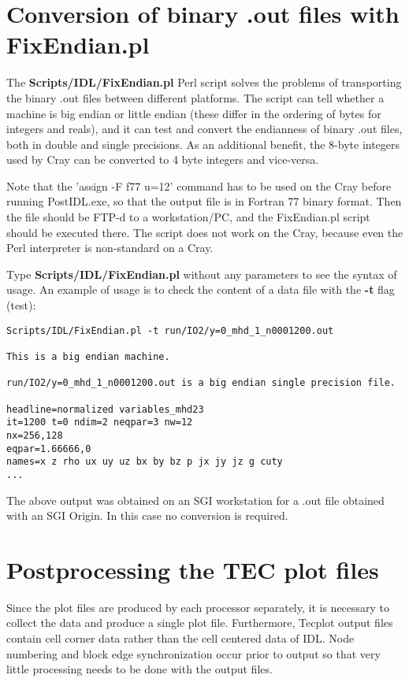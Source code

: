 \section{Conversion of binary .out files with FixEndian.pl \label{section:convert_bin}}

The {\bf Scripts/IDL/FixEndian.pl} Perl script solves the problems of 
transporting the binary .out files between different platforms.
The script can tell whether a machine is big endian or little
endian (these differ in the ordering of bytes for integers and reals),
and it can test and convert the endianness of binary .out files,
both in double and single precisions. As an additional benefit,
the 8-byte integers used by Cray can be converted to 4 byte integers
and vice-versa.

Note that the 'assign -F f77 u=12' command has to be used on the Cray 
before running PostIDL.exe, so that the output file is in Fortran 77 
binary format. Then the file should be FTP-d to a workstation/PC, and the 
FixEndian.pl script should be executed there. The script does not work on
the Cray, because even the Perl interpreter is non-standard on a Cray.

Type {\bf Scripts/IDL/FixEndian.pl} without any parameters to see the syntax of usage.
An example of usage is to check the content of a data file with the
{\bf -t} flag (test):
\begin{verbatim}
Scripts/IDL/FixEndian.pl -t run/IO2/y=0_mhd_1_n0001200.out

This is a big endian machine.

run/IO2/y=0_mhd_1_n0001200.out is a big endian single precision file.

headline=normalized variables_mhd23                                            
it=1200 t=0 ndim=2 neqpar=3 nw=12
nx=256,128
eqpar=1.66666,0
names=x z rho ux uy uz bx by bz p jx jy jz g cuty
...
\end{verbatim}
The above output was obtained on an SGI workstation for a .out file 
obtained with an SGI Origin. In this case no conversion is required.

\section{Postprocessing the TEC plot files \label{section:posttec}}

Since the plot files are produced by each processor separately, it is
necessary to collect the data and produce a single plot file. 
Furthermore, Tecplot output files contain cell corner data rather
than the cell centered data of IDL.  Node numbering and block edge
synchronization occur prior to output so that very little processing
needs to be done with the output files.

